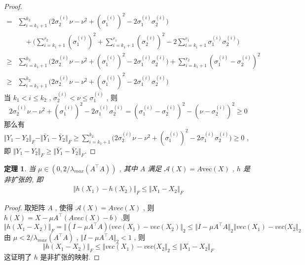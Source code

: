 \documentclass[a4paper, UTF8]{ctexart}				%
\newtheorem{theo}{\bf 定理}[section]			  %
\numberwithin{equation}{section}				%
\newcommand{\upcite}[1]{\textsuperscript{\textsuperscript{\cite{#1}}}}
\begin{document}
\begin{proof}
\begin{equation}
\begin{split}
							=	& \sum^{k_2}_{i = k_1 + 1} \Big( 2 \sigma_2^{(i)} \nu - \nu^2 + (\sigma_1^{(i)})^2 - 2 \sigma_1^{(i)} \sigma_2^{(i)} \Big)\\
								& \quad + \Big( \sum^{r_2}_{i = k_1 + 1} (\sigma_1^{(i)})^2 + \sum^{r_1}_{i = k_1 + 1} (\sigma_2^{(i)})^2 - 2 \sum^{r_1}_{i = k_1 + 1} \sigma_1^{(i)} \sigma_2^{(i)} \Big)\\
							\ge	& \sum^{k_2}_{i = k_1 + 1} \Big( 2 \sigma_2^{(i)} \nu - \nu^2 + (\sigma_1^{(i)})^2 - 2 \sigma_1^{(i)} \sigma_2^{(i)} \Big) + \sum^{r_2}_{i = k_1 + 1} (\sigma_1^{(i)} - \sigma_2^{(i)})^2\\
							\ge	& \sum^{k_2}_{i = k_1 + 1} \Big( 2 \sigma_2^{(i)} \nu - \nu^2 + (\sigma_1^{(i)})^2 - 2 \sigma_1^{(i)} \sigma_2^{(i)} \Big)
						\end{split}
					\end{equation}
					当 $k_1 < i \le k_2$ , $\sigma_2^{(i)} < \nu \le \sigma_1^{(i)}$ , 则 
					\[
						2 \sigma_2^{(i)} \nu - \nu^2 + (\sigma_1^{(i)})^2 - 2 \sigma_1^{(i)} \sigma_2^{(i)} = (\sigma_1^{(i)} - \sigma_2^{(i)})^2 - (\nu - \sigma_2^{(i)})^2 \ge 0
					\]
					那么有 $\Vert{Y_1 - Y_2}\Vert_F - \Vert{\bar{Y}_1 - \bar{Y}_2}\Vert_F \ge \sum^{k_2}_{i = k_1 + 1} \Big( 2 \sigma_2^{(i)} \nu - \nu^2 + (\sigma_1^{(i)})^2 - 2 \sigma_1^{(i)} \sigma_2^{(i)} \Big) \ge 0$ , 即 $\Vert{Y_1 - Y_2}\Vert_F \ge \Vert{\bar{Y}_1 - \bar{Y}_2}\Vert_F$.
				\end{proof}
				
				
				\begin{theo}
					当 $\mu \in (0, 2/\lambda_{max}(A ^\top A))$ , 其中 $A$ 满足 $\mathcal{A}(X) = A \text{vec}(X)$ , $h$ 是非扩张的, 即
					\begin{equation}
						\begin{split}
							\Vert{h(X_1) - h(X_2)}\Vert_F \le \Vert{X_1 - X_2}\Vert_F
						\end{split}
					\end{equation}
				\end{theo}
				
				\begin{proof}\upcite{ma2011fixed}
					取矩阵 $A$ , 使得 $\mathcal{A}(X) = Avec(X)$ , 则 $h(X) = X - \mu A ^\top (Avec(X) - b)$ ,则 
					\[
						\Vert{h(X_1 - X_2)}\Vert_F = \Vert{(I - \mu A ^\top A)(vec(X_1) - vec(X_2)}\Vert_2 \le \Vert{I - \mu A ^\top A}\Vert_2 \Vert{vec(X_1) - vec(X_2}\Vert_2
					\]
					由 $\mu < 2/\lambda_{max}(A ^\top A)$ , $\Vert{I - \mu A ^\top A}\Vert_2 < 1$ , 则 
					\[
						\Vert{h(X_1 - X_2)}\Vert_F \le \Vert{vec(X_1) - vec(X_2}\Vert_2 \le \Vert{X_1 - X_2}\Vert_F
					\]
					这证明了 $h$ 是非扩张的映射.
				\end{proof}
			
\end{document}
